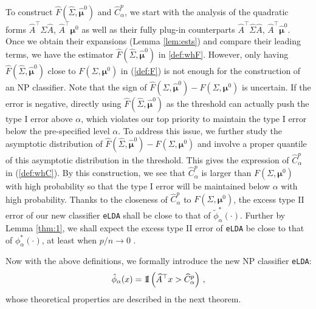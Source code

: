 \documentclass[12pt]{article}
\numberwithin{equation}{section}
\theoremstyle{remark}
\newcommand{\1}{{\rm 1}\kern-0.24em{\rm I}}
\begin{document}
To construct $\widehat{F}(\widehat\Sigma, \hat{\bm{\mu}}^0)$ and $\widehat C_\alpha^p$, we start with the analysis of the quadratic forms $\widehat{A} ^{\top} \Sigma \widehat{A}$, $\widehat{A} ^{\top} {\bm{\mu}}^0$ as well as their fully plug-in counterparts $ \widehat A^{\top} \widehat\Sigma \widehat A$, $ \widehat{A} ^{\top} \hat{\bm{\mu}}^0$. Once we obtain their expansions (Lemma \ref{lem:ests}) and compare their leading terms, we have the estimator $\widehat{F}(\widehat\Sigma, \hat{\bm{\mu}}^0)$ in \eqref{def:whF}. However, only having $\widehat{F}(\widehat\Sigma, \hat{\bm{\mu}}^0)$ close to $F(\Sigma, {\bm{\mu}}^0)$ in (\ref{def:F}) is not enough for the construction of an NP classifier. Note that the sign of $\widehat{F}(\widehat\Sigma, \hat{\bm{\mu}}^0)- F(\Sigma, {\bm{\mu}}^0)$ is uncertain. If the error is negative, directly using $\widehat{F}(\widehat\Sigma, \hat{\bm{\mu}}^0)$ as the threshold can actually  push the type I error above $\alpha$, which violates our top priority to maintain the type I error below the pre-specified level $\alpha$. To address this issue, we further study the asymptotic distribution of $\widehat F(\widehat\Sigma, \hat{\bm{\mu}}^0)-F(\Sigma, {\bm{\mu}}^0)$ and involve a proper quantile of this asymptotic distribution in the threshold. This gives the expression of $\widehat C_\alpha^p$ in (\ref{def:whC}). By this construction, we see that $\widehat C_\alpha^p$ is larger than $F(\Sigma, {\bm{\mu}}^0)$ with high probability so that the type I error will be maintained below $\alpha$ with high probability. Thanks to the  closeness  of $\widehat C_\alpha^p$ to $F(\Sigma, {\bm{\mu}}^0)$, the excess type II error of our new classifier \verb+eLDA+  shall be close to that of $\tilde{\phi}_\alpha^*(\cdot)$. Further by  Lemma \ref{thm:1},  we shall expect the excess type II error of  \verb+eLDA+ be close to that of ${\phi}_\alpha^*(\cdot)$, at least when $p/n\to 0$ .



  

Now with the above definitions, we formally introduce the new NP classifier \verb+eLDA+:
$$\hat{\phi}_\alpha(x)= \1 \left( \widehat{A} ^{\top} x > \widehat C_\alpha^p\right)\,,
$$
whose theoretical properties are described in the next theorem. 

\end{document}
